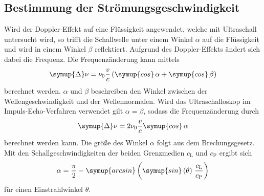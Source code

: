 \subsection{Bestimmung der Strömungsgeschwindigkeit}
\label{subsec:strömung}
Wird der Doppler-Effekt auf eine Flüssigkeit angewendet, welche mit Ultraschall untersucht wird, so trifft die Schallwelle unter einem Winkel $\alpha$ auf die Flüssigkeit
und wird in einem Winkel $\beta$ reflektiert. Aufgrund des Doppler-Effekts ändert sich dabei die Frequenz. Die Frequenzänderung kann mittels
\begin{equation*}
    \symup{\Delta}\nu = \nu_0\frac{v}{c}\left(\symup{cos}\,\alpha + \symup{cos}\,\beta\right)
\end{equation*}
berechnet werden. $\alpha$ und $\beta$ beschreiben den Winkel zwischen der Wellengeschwindigkeit und der Wellennormalen. Wird das Ultraschalloskop 
im Impuls-Echo-Verfahren verwendet gilt $\alpha = \beta$, sodass die Frequenzänderung durch 
\begin{equation}
    \label{eqn:frequenzverschiebung}
    \symup{\Delta}\nu = 2\nu_0\frac{v}{c}\symup{cos}\,\alpha
\end{equation}
berechnet werden kann. Die größe des Winkel $\alpha$ folgt aus dem Brechungsgesetz. Mit den Schallgeschwindigkeiten der beiden Grenzmedien $c_\text{L}$ und $c_\text{P}$
ergibt sich  
\begin{equation}
    \label{eqn:alpha}
    \alpha = \frac{\pi}{2} - \symup{arcsin}\left(\symup{sin}\left(\theta\right)\,\frac{c_\text{L}}{c_\text{P}}\right)
\end{equation}
für einen Einstrahlwinkel $\theta$.
